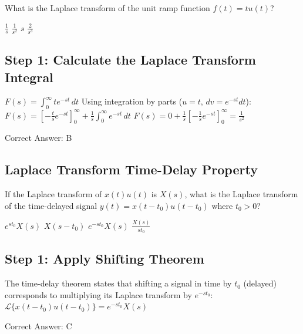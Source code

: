 What is the Laplace transform of the unit ramp function $f(t) = t u(t)$?

\begin{choices}
    \choice $\frac{1}{s}$
    \correctchoice $\frac{1}{s^2}$
    \choice $s$
    \choice $\frac{2}{s^3}$
\end{choices}

\begin{solution}

\subsection*{Step 1: Calculate the Laplace Transform Integral}
$F(s) = \int_{0}^{\infty} t e^{-st}\, dt$
Using integration by parts ($u = t$, $dv = e^{-st} dt$):
$F(s) = \left[ -\frac{t}{s} e^{-st} \right]_{0}^{\infty} + \frac{1}{s} \int_{0}^{\infty} e^{-st}\, dt$
$F(s) = 0 + \frac{1}{s} \left[ -\frac{1}{s} e^{-st} \right]_{0}^{\infty} = \frac{1}{s^2}$

Correct Answer: B
\end{solution}

\clearpage

\subsection{Laplace Transform Time-Delay Property}

If the Laplace transform of $x(t) u(t)$ is $X(s)$, what is the Laplace transform of the time-delayed signal $y(t) = x(t-t_0) u(t-t_0)$ where $t_0 > 0$?

\begin{choices}
    \choice $e^{s t_0} X(s)$
    \choice $X(s - t_0)$
    \correctchoice $e^{-s t_0} X(s)$
    \choice $\frac{X(s)}{s t_0}$
\end{choices}

\begin{solution}

\subsection*{Step 1: Apply Shifting Theorem}
The time-delay theorem states that shifting a signal in time by $t_0$ (delayed) corresponds to multiplying its Laplace transform by $e^{-s t_0}$:
$\mathcal{L}\{x(t - t_0) u(t - t_0)\} = e^{-s t_0} X(s)$

Correct Answer: C
\end{solution}

\clearpage

